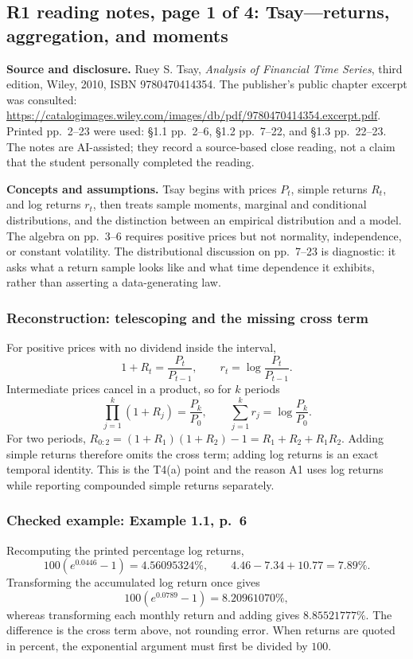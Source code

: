 \subsection*{R1 reading notes, page 1 of 4: Tsay---returns, aggregation, and moments}
\textbf{Source and disclosure.} Ruey S. Tsay, \emph{Analysis of Financial Time Series}, third edition, Wiley, 2010, ISBN 9780470414354. The publisher's public chapter excerpt was consulted: \url{https://catalogimages.wiley.com/images/db/pdf/9780470414354.excerpt.pdf}. Printed pp.~2--23 were used: \S1.1 pp.~2--6, \S1.2 pp.~7--22, and \S1.3 pp.~22--23. The notes are AI-assisted; they record a source-based close reading, not a claim that the student personally completed the reading.

\textbf{Concepts and assumptions.} Tsay begins with prices $P_t$, simple returns $R_t$, and log returns $r_t$, then treats sample moments, marginal and conditional distributions, and the distinction between an empirical distribution and a model. The algebra on pp.~3--6 requires positive prices but not normality, independence, or constant volatility. The distributional discussion on pp.~7--23 is diagnostic: it asks what a return sample looks like and what time dependence it exhibits, rather than asserting a data-generating law.

\subsubsection*{Reconstruction: telescoping and the missing cross term}
For positive prices with no dividend inside the interval,
\[
 1+R_t=\frac{P_t}{P_{t-1}},\qquad
 r_t=\log\frac{P_t}{P_{t-1}}.
\]
Intermediate prices cancel in a product, so for $k$ periods
\[
 \prod_{j=1}^{k}(1+R_j)=\frac{P_k}{P_0},\qquad
 \sum_{j=1}^{k}r_j=\log\frac{P_k}{P_0}.
\]
For two periods, $R_{0:2}=(1+R_1)(1+R_2)-1=R_1+R_2+R_1R_2$. Adding simple returns therefore omits the cross term; adding log returns is an exact temporal identity. This is the T4(a) point and the reason A1 uses log returns while reporting compounded simple returns separately.

\subsubsection*{Checked example: Example 1.1, p.~6}
Recomputing the printed percentage log returns,
\[
 100(e^{0.0446}-1)=4.56095324\%,\qquad
 4.46-7.34+10.77=7.89\%.
\]
Transforming the accumulated log return once gives
\[
 100(e^{0.0789}-1)=8.20961070\%,
\]
whereas transforming each monthly return and adding gives $8.85521777\%$. The difference is the cross term above, not rounding error. When returns are quoted in percent, the exponential argument must first be divided by $100$.

